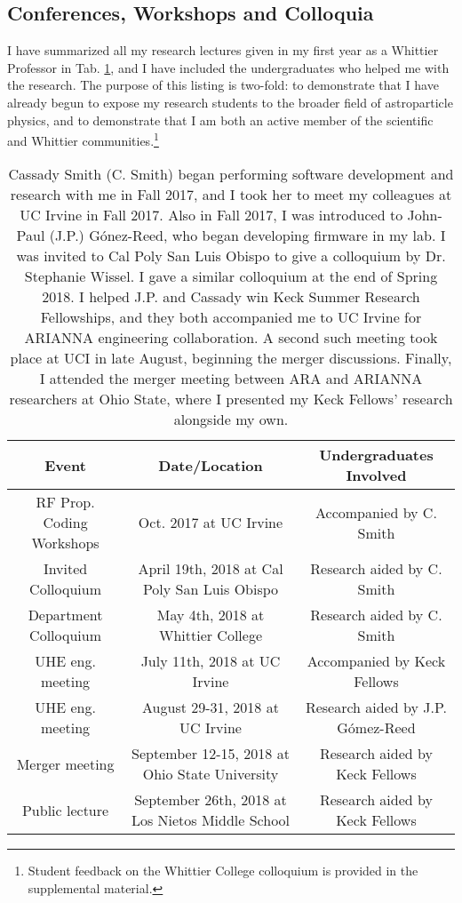 \documentclass[../../main.tex]{subfiles}
\begin{document}
\subsection{Conferences, Workshops and Colloquia}

I have summarized all my research lectures given in my first year as a Whittier Professor in Tab. \ref{tab:conf}, and I have included the undergraduates who helped me with the research.  The purpose of this listing is two-fold: to demonstrate that I have already begun to expose my research students to the broader field of astroparticle physics, and to demonstrate that I am both an active member of the scientific and Whittier communities.\footnote{Student feedback on the Whittier College colloquium is provided in the supplemental material.}

\begin{table}
\small
\centering
\begin{tabular}{|c|c|c|}
\hline \hline
Event & Date/Location & Undergraduates Involved \\ \hline
RF Prop. Coding Workshops & Oct. 2017 at UC Irvine & Accompanied by C. Smith \\ \hline
Invited Colloquium & April 19th, 2018 at Cal Poly San Luis Obispo & Research aided by C. Smith \\ \hline
Department Colloquium & May 4th, 2018 at Whittier College & Research aided by C. Smith \\ \hline
UHE eng. meeting & July 11th, 2018 at UC Irvine & Accompanied by Keck Fellows \\ \hline
UHE eng. meeting & August 29-31, 2018 at UC Irvine & Research aided by J.P. G\'{o}mez-Reed \\ \hline
Merger meeting & September 12-15, 2018 at Ohio State University & Research aided by Keck Fellows \\ \hline
Public lecture & September 26th, 2018 at Los Nietos Middle School & Research aided by Keck Fellows \\ \hline
\hline
\end{tabular}
\caption{\label{tab:conf} Cassady Smith (C. Smith) began performing software development and research with me in Fall 2017, and I took her to meet my colleagues at UC Irvine in Fall 2017. Also in Fall 2017, I was introduced to John-Paul (J.P.) G\'{o}nez-Reed, who began developing firmware in my lab.  I was invited to Cal Poly San Luis Obispo to give a colloquium by Dr. Stephanie Wissel.  I gave a similar colloquium at the end of Spring 2018.  I helped J.P. and Cassady win Keck Summer Research Fellowships, and they both accompanied me to UC Irvine for ARIANNA engineering collaboration.  A second such meeting took place at UCI in late August, beginning the merger discussions.  Finally, I attended the merger meeting between ARA and ARIANNA researchers at Ohio State, where I presented my Keck Fellows' research alongside my own.}
\end{table}
\end{document}
